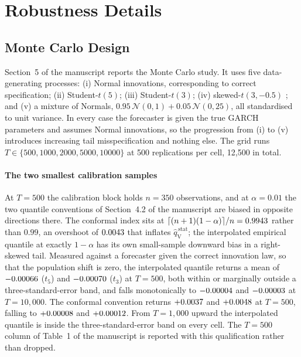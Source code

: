 \documentclass[preprint,11pt,authoryear]{elsarticle}
\newcommand{\1}{\boldsymbol{1}}
\newcommand{\qVstat}{\hat{q}_{\scriptscriptstyle\mathrm{V}}^{\,\mathrm{stat}}}
\begin{document}

\section{Robustness Details}
\label{app:robustness}

\subsection{Monte Carlo Design}
\label{app:mc_design}

Section~5 of the manuscript reports the Monte Carlo study. It uses five
data-generating processes: (i) Normal innovations, corresponding to correct
specification; (ii) Student-$t(5)$; (iii) Student-$t(3)$; (iv) skewed-$t(3,
-0.5)$ \citep{hansen1994autoregressive}; and (v) a mixture of Normals,
$0.95\,\mathcal N(0,1)+0.05\,\mathcal N(0,25)$, all standardised to unit
variance. In every case the forecaster is given the true GARCH parameters and
assumes Normal innovations, so the progression from (i) to (v) introduces
increasing tail misspecification and nothing else. The grid runs
$T\in\{500,1000,2000,5000,10000\}$ at 500 replications per cell, 12{,}500 in
total.

\paragraph{The two smallest calibration samples} At $T = 500$ the calibration
block holds $n = 350$ observations, and at $\alpha = 0.01$ the two quantile
conventions of Section~4.2 of the manuscript are biased in opposite directions
there. The conformal index sits at $\lceil (n+1)(1-\alpha)\rceil/n =
0.9943$ rather than $0.99$, an overshoot of $0.0043$ that
inflates $\qVstat$; the
interpolated empirical quantile at exactly $1-\alpha$ has its own small-sample
downward bias in a right-skewed tail. Measured against a forecaster given the
correct innovation law, so that the population shift is zero, the interpolated
quantile returns a mean of $-0.00066$ ($t_5$) and
$-0.00070$ ($t_3$) at
$T = 500$, both within or marginally outside a three-standard-error band, and
falls monotonically to $-0.00004$ and
$-0.00003$ at $T = 10{,}000$. The
conformal convention returns $+0.0037$ and
$+0.0048$ at $T = 500$, falling to
$+0.00008$ and $+0.00012$. From $T = 1{,}000$
upward the interpolated quantile is inside the three-standard-error band on
every cell. The $T = 500$ column of
Table~1 of the manuscript is reported with this qualification rather than
dropped.
\end{document}

